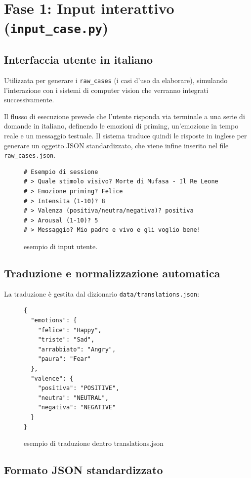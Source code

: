 \documentclass[11pt]{report}
\begin{document}
\section{Fase 1: Input interattivo (\texttt{input\_case.py})}
 
\subsection{Interfaccia utente in italiano}
Utilizzata per generare i \texttt{raw\_cases} (i casi d'uso da elaborare), simulando l'interazione con i sistemi di computer vision che verranno integrati successivamente.

Il flusso di esecuzione prevede che l'utente risponda via terminale a una serie di domande in italiano, definendo le emozioni di priming, un'emozione in tempo reale e un messaggio testuale. Il sistema traduce quindi le risposte in inglese per generare un oggetto JSON standardizzato, che viene infine inserito nel file \texttt{raw\_cases.json}.
 
\begin{figure}[H]
\begin{verbatim}
# Esempio di sessione
# > Quale stimolo visivo? Morte di Mufasa - Il Re Leone
# > Emozione priming? Felice
# > Intensita (1-10)? 8
# > Valenza (positiva/neutra/negativa)? positiva
# > Arousal (1-10)? 5
# > Messaggio? Mio padre e vivo e gli voglio bene!
\end{verbatim}
\caption{esempio di input utente.}
\end{figure}

\subsection{Traduzione e normalizzazione automatica}
 
La traduzione è gestita dal dizionario \texttt{data/translations.json}:
 
\begin{figure}[H]
\begin{verbatim}
{
  "emotions": {
    "felice": "Happy",
    "triste": "Sad",
    "arrabbiato": "Angry",
    "paura": "Fear"
  },
  "valence": {
    "positiva": "POSITIVE",
    "neutra": "NEUTRAL",
    "negativa": "NEGATIVE"
  }
}
\end{verbatim}
\caption{esempio di traduzione dentro translations.json}
\end{figure}
 
\subsection{Formato JSON standardizzato}
 
\end{document}
